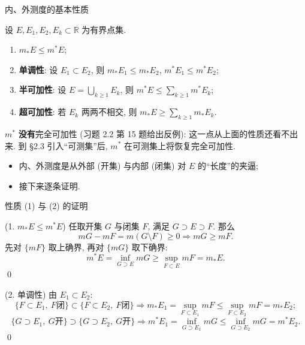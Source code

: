 \begin{frame}{内、外测度的基本性质}

\begin{thm}[内、外测度的基本性质]
设 $E, E_1, E_2, E_k \subset \mathbb{R}$ 为有界点集.
\begin{enumerate}
\item $m_* E \leqslant m^* E$;
\item \textbf{单调性}: 设 $E_1 \subset E_2$, 则 $m_* E_1 \leqslant m_* E_2$, $m^* E_1 \leqslant m^* E_2$;
\item \textbf{半可加性}: 设 $E = \bigcup_{k \geqslant 1} E_k$, 则 $m^* E \leqslant \sum_{k \geqslant 1} m^* E_k$;
\item \textbf{超可加性}: 若 $E_k$ 两两不相交, 则 $m_* E \geqslant \sum_{k \geqslant 1} m_* E_k$.
\end{enumerate}
\end{thm}

\begin{attnblock}[注意]
$m^*$ \textbf{没有}完全可加性 (习题 2.2 第 15 题给出反例): 这一点从上面的性质还看不出来. 到 §2.3 引入``可测集''后, $m^*$ 在可测集上将恢复完全可加性.
\end{attnblock}

\pause

\begin{itemize}
\item 内、外测度是从外部 (开集) 与内部 (闭集) 对 $E$ 的``长度''的夹逼;
\item 接下来逐条证明.
\end{itemize}

\end{frame}


\begin{frame}{性质 (1) 与 (2) 的证明}

\startproof[bg=yellow, fg=red](1. $m_* E \leqslant m^* E$)
任取开集 $G$ 与闭集 $F$, 满足 $G \supset E \supset F$. 那么
\[
m G - m F = m (G \setminus F) \geqslant 0
\Longrightarrow m G \geqslant m F .
\]
先对 $\{m F\}$ 取上确界, 再对 $\{m G\}$ 取下确界:
\[
m^* E = \inf_{G \supset E} m G \geqslant \sup_{F \subset E} m F = m_* E .
\]
\qed

\pause

\startproof[bg=yellow, fg=red](2. 单调性)
由 $E_1 \subset E_2$:
\[
\{F \subset E_1,\ F \text{闭}\} \subset \{F \subset E_2,\ F \text{闭}\}
\Longrightarrow m_* E_1 = \sup_{F \subset E_1} m F \leqslant \sup_{F \subset E_2} m F = m_* E_2 ;
\]
\[
\{G \supset E_1,\ G \text{开}\} \supset \{G \supset E_2,\ G \text{开}\}
\Longrightarrow m^* E_1 = \inf_{G \supset E_1} m G \leqslant \inf_{G \supset E_2} m G = m^* E_2 .
\]
\qed

\end{frame}

